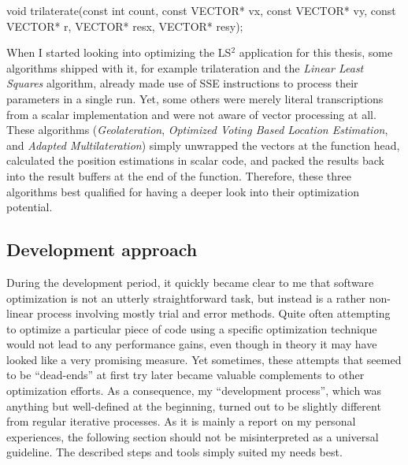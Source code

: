 \begin{code}[caption={Prototype of the \texttt{trilaterate} function},label=prototype]
void trilaterate(const int count, const VECTOR* vx, 
                 const VECTOR* vy, const VECTOR* r, 
                 VECTOR* resx, VECTOR* resy);
\end{code}

When I started looking into optimizing the LS$^{2}$ application for this thesis, some algorithms shipped with it, for example trilateration and the \emph{Linear Least Squares} algorithm, already made use of SSE instructions to process their parameters in a single run. Yet, some others were merely literal transcriptions from a scalar implementation and were not aware of vector processing at all. These algorithms (\emph{Geolateration}, \emph{Optimized Voting Based Location Estimation}, and \emph{Adapted Multilateration}) simply unwrapped the vectors at the function head, calculated the position estimations in scalar code, and packed the results back into the result buffers at the end of the function. Therefore, these three algorithms best qualified for having a deeper look into their optimization potential.

\subsection{Development approach}
During the development period, it quickly became clear to me that software optimization is not an utterly straightforward task, but instead is a rather non-linear process involving mostly trial and error methods. Quite often attempting to optimize a particular piece of code using a specific optimization technique would not lead to any performance gains, even though in theory it may have looked like a very promising measure. Yet sometimes, these attempts that seemed to be ``dead-ends'' at first try later became valuable complements to other optimization efforts. As a consequence, my ``development process'', which was anything but well-defined at the beginning, turned out to be slightly different from regular iterative processes. As it is mainly a report on my personal experiences, the following section should not be misinterpreted as a universal guideline. The described steps and tools simply suited my needs best.

